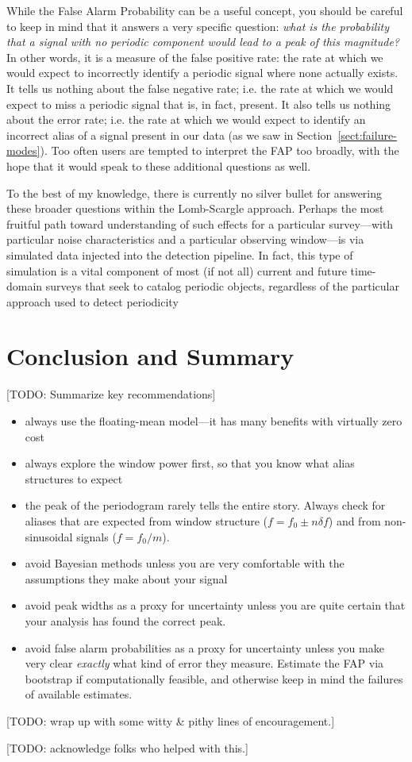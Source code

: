\documentclass[preprint]{aastex}
\newcommand{\todo}[1]{{\color{red} [TODO: #1]}}
\newcommand{\Sect}[1]{Section~\ref{sect:#1}}
\newcommand{\sect}[1]{\Sect{#1}}
\begin{document}

While the False Alarm Probability can be a useful concept, you should be
careful to keep in mind that it answers a very specific question:
{\it what is the probability that a signal with no periodic component would
lead to a peak of this magnitude?}
In other words, it is a measure of the false positive rate: the rate at which
we would expect to incorrectly identify a periodic signal where none
actually exists.
It tells us nothing about the false negative rate; {i.e.} the rate at which
we would expect to miss a periodic signal that is, in fact, present.
It also tells us nothing about the error rate; {i.e.} the rate at which we
would expect to identify an incorrect alias of a signal present in our data
(as we saw in \sect{failure-modes}).
Too often users are tempted to interpret the FAP too broadly, with the hope that
it would speak to these additional questions as well.

To the best of my knowledge, there is currently no silver bullet for answering
these broader questions within the Lomb-Scargle approach.
Perhaps the most fruitful path toward understanding of such effects for a
particular survey---with particular noise characteristics and a particular
observing window---is via simulated data injected into the detection
pipeline.
In fact, this type of simulation is a vital component of most (if not all)
current and future time-domain surveys that seek to catalog periodic objects,
regardless of the particular approach used to detect periodicity
\citep[see, e.g.][]{opsim1, opsim2, Ivezic08LSST, Sesar2010, Oluseyi12, McQuillan2012, Drake2014}



\section{Conclusion and Summary}

\todo{Summarize key recommendations}

\begin{itemize}
\item always use the floating-mean model---it has many benefits with virtually zero cost
\item always explore the window power first, so that you know what alias structures to expect
\item the peak of the periodogram rarely tells the entire story. Always check
  for aliases that are expected from window structure ($f = f_0 \pm n\delta f$)
  and from non-sinusoidal signals ($f = f_0 / m$).
\item avoid Bayesian methods unless you are very comfortable with the
  assumptions they make about your signal
\item avoid peak widths as a proxy for uncertainty unless you are quite
  certain that your analysis has found the correct peak.
\item avoid false alarm probabilities as a proxy for uncertainty
  unless you make very clear {\it exactly} what kind of error they measure.
  Estimate the FAP via bootstrap if computationally feasible, and otherwise
  keep in mind the failures of available estimates.
\end{itemize}

\todo{wrap up with some witty \& pithy lines of encouragement.}

\todo{acknowledge folks who helped with this.}



\end{document}
